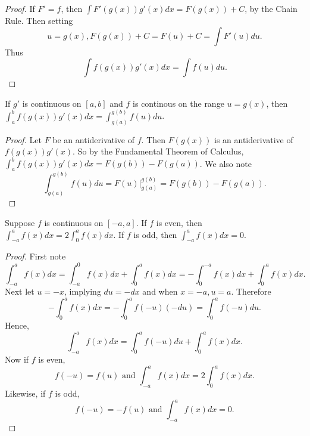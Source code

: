 \documentclass[a4paper,11pt]{article}
\begin{document}
\begin{outline}
    \begin{proof}
      If \(F'=f\), then \(\int F'(g(x))g'(x)dx = F(g(x)) + C\), by the Chain Rule. Then setting
      \[ u = g(x), F(g(x)) + C = F(u) + C = \int F'(u)du\text{.} \] Thus 
      \[ \int f(g(x))g'(x)dx = \int f(u)du\text{.} \]
    \end{proof}

    If \(g'\) is continuous on \([a, b]\) and \(f\) is continous on the range \(u=g(x)\), then 
    \(\int_a^b f(g(x))g'(x)dx = \int_{g(a)}^{g(b)} f(u)du\).
    
    \begin{proof}
      Let \(F\) be an antiderivative of \(f\). Then \(F(g(x))\) is an antiderivative of \(f(g(x))g'(x)\). So
      by the Fundamental Theorem of Calculus, \(\int_a^b f(g(x))g'(x)dx = F(g(b)) - F(g(a))\). We also note 
      \[ \int_{g(a)}^{g(b)} f(u)du = F(u)\vert_{g(a)}^{g(b)} = F(g(b))-F(g(a))\text{.} \]
    \end{proof}
    
    Suppose \(f\) is continuous on \([-a, a]\). If \(f\) is even, then \(\int_{-a}^{a}f(x)dx = 2\int_0^a f(x)dx\).
    If \(f\) is odd, then \(\int_{-a}^a f(x)dx = 0\).
    
    \begin{proof}
      First note 
      \[
        \int_{-a}^a f(x)dx 
          = \int_{-a}^0 f(x)dx + \int_0^a f(x)dx
          = -\int_0^{-a} f(x)dx + \int_0^a f(x)dx\text{.}
      \]
      Next let \(u = -x\), implying \(du = -dx\) and when \(x = -a, u = a\). Therefore
      \[
        -\int_0^a f(x)dx = -\int_0^a f(-u)(-du) = \int_0^a f(-u)du\text{.}
      \]
      Hence, \[\int_{-a}^a f(x)dx = \int_0^a f(-u)du + \int_0^a f(x)dx\text{.}\]
      Now if \(f\) is even, \[f(-u)=f(u)\text{ and }\int_{-a}^a f(x)dx = 2\int_0^a f(x)dx\text{.}\] 
      Likewise, if \(f\) is odd, \[f(-u) = -f(u)\text{ and }\int_{-a}^a f(x)dx = 0\text{.}\]
    \end{proof}

\end{outline}
\end{document}
